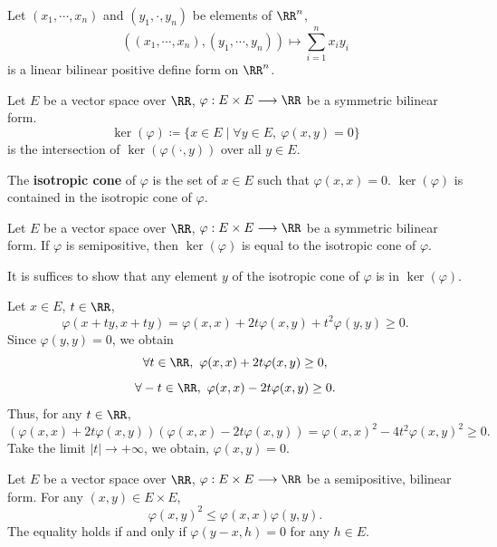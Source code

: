 \begin{exampleenv}
    Let $(x_1,\cdots,x_n)$ and $(y_1,\cdot,y_n)$ be elements of $\RR^n$,
    $$ \left((x_1,\cdots,x_n),(y_1,\cdots,y_n)\right) \longmapsto \sum_{i=1}^{n} x_i y_i$$
    is a linear bilinear positive define form on $\RR^n$.
\end{exampleenv}
\begin{definitionenv}
    Let $E$ be a vector space over $\RR$, $\varphi: E\times E\longrightarrow \RR$ be a symmetric bilinear form.
    $$ \ker (\varphi)\coloneq \{x\in E\mid \forall y\in E, \ \varphi(x,y)=0\}$$
    is the intersection of $\ker\left(\varphi(\cdot,y)\right)$ over all $y\in E$.

    \quad The \textbf{isotropic cone} of $\varphi$ is the set of $x\in E$ such that $\varphi(x,x)=0$. $\ker(\varphi)$ is contained  in the isotropic cone of $\varphi$.
\end{definitionenv}
\begin{propositionenv}
    Let $E$ be a vector space over $\RR$, $\varphi: E\times E\longrightarrow \RR$ be a symmetric bilinear form.
    If $\varphi$ is semipositive, then $\ker(\varphi)$ is equal to the isotropic cone of $\varphi$.
\end{propositionenv}
\begin{proofenv}
    It is suffices to show that any element $y$ of the isotropic cone of $\varphi $ is in $\ker(\varphi)$.

    \quad Let $x\in E$, $t\in \RR$,
    $$ \varphi(x+ty,x+ty)=\varphi(x,x)+ 2t\varphi(x,y)+t^2\varphi(y,y)\ge 0.$$
    Since $\varphi(y,y)=0$, we obtain 
    $$ \forall t\in \RR,\ \varphi(x,x) + 2t\varphi(x,y)\ge 0,$$
    $$ \forall -t\in \RR,\ \varphi(x,x) - 2t\varphi(x,y)\ge 0.$$
    Thus, for any $t\in\RR$,
    $$\left(\varphi(x,x) + 2t\varphi(x,y)\right)\left(\varphi(x,x) - 2t\varphi(x,y)\right)= \varphi(x,x)^2-4t^2\varphi(x,y)^2\ge 0. $$
    Take the limit $|t|\rightarrow +\infty$, we obtain, $\varphi(x,y)=0$.
\end{proofenv}
\begin{theoremenv}
    Let $E$ be a vector space over $\RR$, $\varphi: E\times E\longrightarrow \RR$ be a semipositive, bilinear form. For any $(x,y)\in E\times E$,
    $$ \varphi(x,y)^2\le \varphi (x,x)\varphi(y,y).$$
    The equality holds if and only if $\varphi(y-x,h)=0$ for any $h\in E$.
\end{theoremenv}

